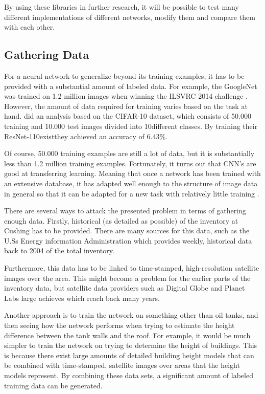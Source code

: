 By using these libraries in further research, it will be possible to test many different implementations of different networks, modify them and compare them with each other.

\subsection*{Gathering Data}
For a neural network to generalize beyond its training examples, it has to be provided with a substantial amount of labeled data. For example, the GoogleNet was trained on 1.2 million images when winning the ILSVRC 2014 challenge \citep{Szegedy2014}.  However, the amount of data required for training varies based on the task at hand. \cite{Wu2017} did an analysis based on the CIFAR-10 dataset, which consists of 50.000 training and 10.000 test images divided into 10different classes. By training their ResNet-110existthey achieved an accuracy of 6.43\%.

Of course, 50.000 training examples are still a lot of data, but it is substantially less than 1.2 million training examples.  Fortunately, it turns out that CNN's are good at transferring learning.  Meaning that once a network has been trained with an extensive database, it has adapted well enough to the structure of image data in general so that it can be adapted for a new task with relatively little training \citep{Marmanis2016}. 

There are several ways to attack the presented problem in terms of gathering enough data. Firstly, historical (as detailed as possible) of the inventory at Cushing has to be provided. There are many sources for this data, such as the U.Ss Energy information Administration which provides weekly, historical data back to 2004 of the total inventory.

Furthermore, this data has to be linked to time-stamped, high-resolution satellite images over the area.  This might become a problem for the earlier parts of the inventory data, but satellite data providers such as Digital Globe and Planet Labs large achieves which reach back many years.

Another approach is to train the network on something other than oil tanks, and then seeing how the network performs when trying to estimate the height difference between the tank walls and the roof. For example, it would be much simpler to train the network on trying to determine the height of buildings. This is because there exist large amounts of detailed building height models that can be combined with time-stamped, satellite images over areas that the height models represent. By combining these data sets, a significant amount of labeled training data can be generated.